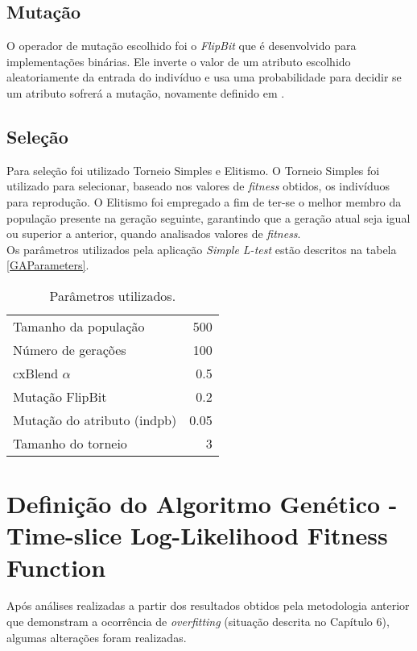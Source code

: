 \subsection{Mutação}

O operador de mutação escolhido foi o {\it FlipBit} que é desenvolvido para implementações binárias. Ele inverte o valor de um atributo escolhido aleatoriamente da entrada do indivíduo e usa uma probabilidade para decidir se um atributo sofrerá a mutação, novamente definido em \citep{Goldberg:1989:GAS:534133}.


\subsection{Seleção}

Para seleção foi utilizado Torneio Simples e Elitismo. O Torneio Simples foi utilizado para selecionar, baseado nos valores de {\it fitness} obtidos, os indivíduos para reprodução. O Elitismo foi empregado a fim de ter-se o melhor membro da população presente na geração seguinte, garantindo que a geração atual seja igual ou superior a anterior, quando analisados valores de {\it fitness}.\\

Os parâmetros utilizados pela aplicação {\it Simple L-test} estão descritos na tabela \ref{GAParameters}.\\

\begin{table}[!h]
  \begin{center}
  \begin{tabular}{|l|r|}
    \hline
    Tamanho da população & 500\\
    Número de gerações & 100\\
    cxBlend $\alpha$ & 0.5\\
    Mutação FlipBit & 0.2\\
    Mutação do atributo (indpb) & 0.05 \\
    Tamanho do torneio & 3\\
    \hline    
  \end{tabular}
  \end{center}
  \caption{Parâmetros utilizados.}
  \label{GAParameters----}
\end{table}

\section{Definição do Algoritmo Genético - Time-slice Log-Likelihood Fitness Function}
Após análises realizadas a partir dos resultados obtidos pela metodologia anterior que demonstram a ocorrência de {\it overfitting} (situação descrita no Capítulo 6), algumas alterações foram realizadas.\\

